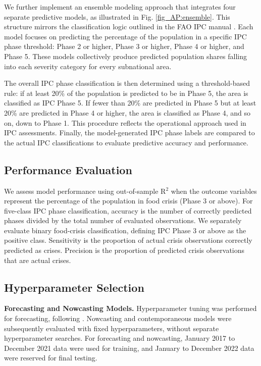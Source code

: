 \documentclass[pdflatex,sn-mathphys-num]{sn-jnl}%
\theoremstyle{thmstyleone}%
\theoremstyle{thmstyletwo}%
\theoremstyle{thmstylethree}%
\begin{document}
We further implement an ensemble modeling approach that integrates four separate predictive models, as illustrated in Fig. \ref{fig_AP:ensemble}. This structure mirrors the classification logic outlined in the FAO IPC manual \citep{IPC2021}. Each model focuses on predicting the percentage of the population in a specific IPC phase threshold: Phase 2 or higher, Phase 3 or higher, Phase 4 or higher, and Phase 5. These models collectively produce predicted population shares falling into each severity category for every subnational area.

The overall IPC phase classification is then determined using a threshold-based rule: if at least 20\% of the population is predicted to be in Phase 5, the area is classified as IPC Phase 5. If fewer than 20\% are predicted in Phase 5 but at least 20\% are predicted in Phase 4 or higher, the area is classified as Phase 4, and so on, down to Phase 1. This procedure reflects the operational approach used in IPC assessments. Finally, the model-generated IPC phase labels are compared to the actual IPC classifications to evaluate predictive accuracy and performance.

\subsection*{Performance Evaluation}

We assess model performance using out-of-sample R$^{2}$  when the outcome variables represent the percentage of the population in food crisis (Phase 3 or above). %
For five-class IPC phase classification, accuracy is the number of correctly predicted phases divided by the total number of evaluated observations. We separately evaluate binary food-crisis classification, defining IPC Phase 3 or above as the positive class. Sensitivity is the proportion of actual crisis observations correctly predicted as crises. Precision is the proportion of predicted crisis observations that are actual crises.

\subsection*{Hyperparameter Selection}

\noindent\textbf{Forecasting and Nowcasting Models.}
Hyperparameter tuning was performed for forecasting, following \cite{westerveld2021forecasting}. Nowcasting and contemporaneous models were subsequently evaluated with fixed hyperparameters, without separate hyperparameter searches. For forecasting and nowcasting, January 2017 to December 2021 data were used for training, and January to December 2022 data were reserved for final testing.
\end{document}
